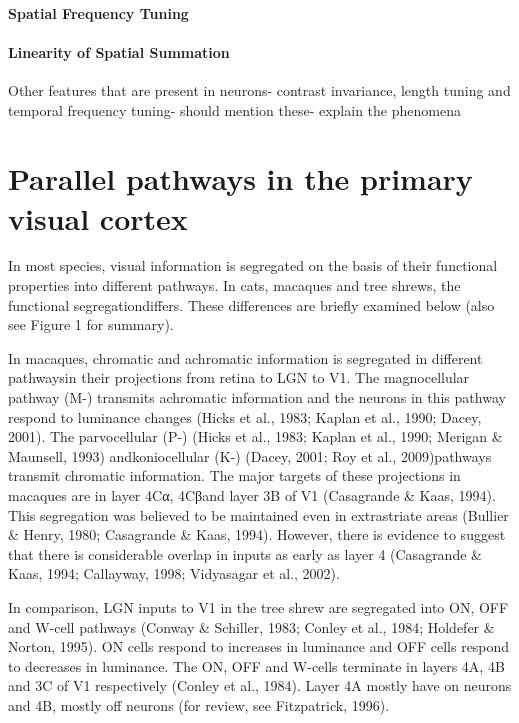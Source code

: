 \paragraph{Spatial Frequency Tuning}

\paragraph{Linearity of Spatial Summation}

Other features that are present in neurons- contrast invariance, length tuning and temporal frequency tuning- should mention these- explain the phenomena

\section{Parallel pathways in the primary visual cortex}

In most species, visual information is segregated on the basis of their functional properties into different pathways. In cats, macaques and tree shrews, the functional segregationdiffers. These differences are briefly examined below (also see Figure 1 for summary).

In macaques, chromatic and achromatic information is segregated in different pathwaysin their projections from retina to LGN to V1. The magnocellular pathway (M-) transmits achromatic information and the neurons in this pathway respond to luminance changes (Hicks et al., 1983; Kaplan et al., 1990; Dacey, 2001). The parvocellular (P-) (Hicks et al., 1983; Kaplan et al., 1990; Merigan \& Maunsell, 1993) andkoniocellular (K-) (Dacey, 2001; Roy et al., 2009)pathways transmit chromatic information. The  major targets of these projections in macaques are in layer 4Cα, 4Cβand layer 3B of V1 (Casagrande \& Kaas, 1994). This segregation was believed to be maintained even in extrastriate areas (Bullier \& Henry, 1980; Casagrande \& Kaas, 1994). However, there is evidence to suggest that there is considerable overlap in inputs as early as layer 4 (Casagrande \& Kaas, 1994; Callayway, 1998; Vidyasagar et al., 2002).

In comparison, LGN inputs to V1 in the tree shrew are segregated into ON, OFF and W-cell pathways (Conway \& Schiller, 1983; Conley et al., 1984; Holdefer \& Norton, 1995). ON cells respond to increases in luminance and OFF cells respond to decreases in luminance. The ON, OFF and W-cells terminate in layers 4A, 4B and 3C of V1 respectively (Conley et al., 1984). Layer 4A mostly have on neurons and 4B, mostly off neurons (for review, see Fitzpatrick, 1996).

